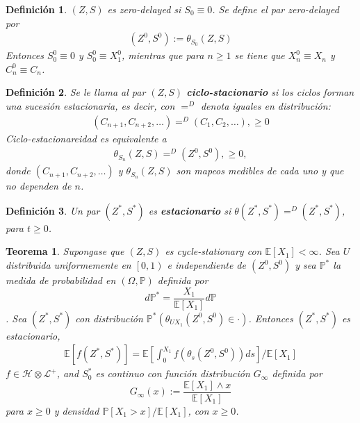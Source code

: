 \documentclass{article}
\newtheorem{Def}{Definición}[section]
\newtheorem{Teo}{Teorema}[section]
\newcommand{\esp}{\mathbb{E}}
\newcommand{\prob}{\mathbb{P}}
\numberwithin{equation}{section}
\begin{document}
\begin{Def}
$\left(Z,S\right)$ es \textit{zero-delayed} si $S_{0}\equiv0$. Se define el par \textit{zero-delayed} por
\begin{eqnarray*}
\left(Z^{0},S^{0}\right):=\theta_{S_{0}}\left(Z,S\right)
\end{eqnarray*}
Entonces $S_{0}^{0}\equiv0$ y $S_{0}^{0}\equiv X_{1}^{0}$, mientras que para $n\geq1$ se tiene que $X_{n}^{0}\equiv X_{n}$ y $C_{n}^{0}\equiv C_{n}$.
\end{Def}

\begin{Def}
Se le llama al par $\left(Z,S\right)$ \textbf{ciclo-stacionario} si los ciclos forman una sucesi\'on estacionaria, es decir, con $=^{D}$ denota iguales en distribuci\'on:
\begin{eqnarray*}
\left(C_{n+1},C_{n+2},\ldots\right)=^{D}\left(C_{1},C_{2},\ldots\right),\geq0
\end{eqnarray*}
Ciclo-estacionareidad es equivalente a 
\begin{eqnarray*}
\theta_{S_{n}}\left(Z,S\right)=^{D}
\left(Z^{0},S^{0}\right),\geq0,
\end{eqnarray*}
donde $\left(C_{n+1},C_{n+2},\ldots\right)$ y $\theta_{S_{n}}\left(Z,S\right)$ son mapeos medibles de cada uno y que no dependen de $n$.
\end{Def}


\begin{Def}
Un par $\left(Z^{*},S^{*}\right)$ es \textbf{estacionario} si $\theta\left(Z^{*},S^{*}\right)=^{D}
\left(Z^{*},S^{*}\right)$, para $t\geq0$.
\end{Def}


\begin{Teo}\label{Teorema.2.1}
Supongase que $\left(Z,S\right)$ es cycle-stationary con $\esp\left[X_{1}\right]<\infty$. Sea $U$ distribuida uniformemente en $\left[0,1\right)$ e independiente de $\left(Z^{0},S^{0}\right)$ y sea $\prob^{*}$ la medida de probabilidad en $\left(\Omega,\prob\right)$ definida por $$d\prob^{*}=\frac{X_{1}}{\esp\left[X_{1}\right]}d\prob$$. Sea $\left(Z^{*},S^{*}\right)$ con distribuci\'on $\prob^{*}\left(\theta_{UX_{1}}\left(Z^{0},S^{0}\right)\in\cdot\right)$. Entonces $\left(Z^{*},S^{*}\right)$ es estacionario,
\begin{eqnarray*}
\esp\left[f\left(Z^{*},S^{*}\right)\right]=\esp\left[\int_{0}^{X_{1}}f\left(\theta_{s}\left(Z^{0},S^{0}\right)\right)ds\right]/\esp\left[X_{1}\right]
\end{eqnarray*}
$f\in\mathcal{H}\otimes\mathcal{L}^{+}$, and $S_{0}^{*}$ es continuo con funci\'on distribuci\'on $G_{\infty}$ definida por $$G_{\infty}\left(x\right):=\frac{\esp\left[X_{1}\right]\wedge x}{\esp\left[X_{1}\right]}$$ para $x\geq0$ y densidad $\prob\left[X_{1}>x\right]/\esp\left[X_{1}\right]$, con $x\geq0$.
\end{Teo}
\end{document}
